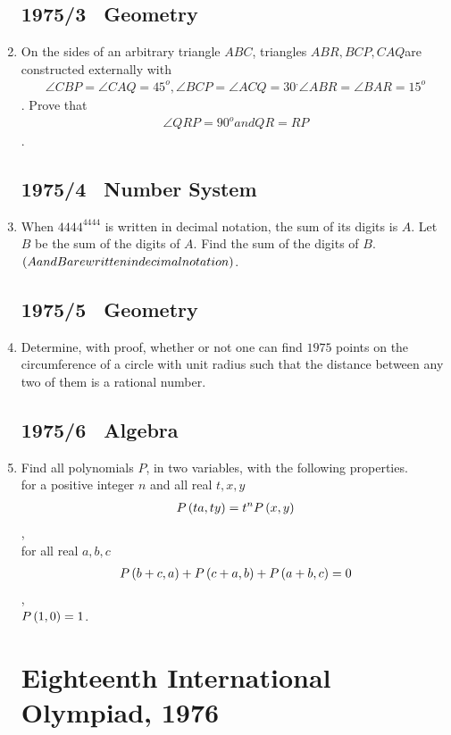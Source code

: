 \documentclass{article}
\begin{document}
\begin{enumerate}
			\subsection*{1975/3 \ Geometry}
		\item On the sides of an arbitrary triangle $ABC$, triangles $ABR, BCP, CAQ $are constructed externally with \begin{align}\angle CBP = \angle CAQ = 45^o, \angle BCP = \angle ACQ = 30^, \angle ABR = \angle BAR = 15^o\end{align}. Prove that \begin{align}\angle QRP = 90^o and QR = RP\end{align}.
\subsection*{1975/4 \ Number System}
			\item When $4444^{4444}$ is written in decimal notation, the sum of its digits is $A$. Let $B$ be the sum of the digits of $A$. Find the sum of the digits of $B$. $\left(A and B are written in decimal notation\right)$.
\subsection*{1975/5 \ Geometry}

			\item Determine, with proof, whether or not one can find $1975$ points on the circumference of a circle with unit radius such that the distance between any two of them is a rational number.
\subsection*{1975/6 \ Algebra}
			\item Find all polynomials $P$, in two variables, with the following properties.\\  for a positive integer $n$ and all real $t, x, y$
				\begin{align} P\left(ta,ty\right)=t^n P\left(x,y\right) \end{align}
					,\\  for all real $a, b, c$ \begin{align}P\left(b + c, a\right) +P\left(c + a, b\right) +P\left(a + b, c\right) =0\end{align},\\  $P\left(1, 0\right) = 1$.

\newpage
		\section*{Eighteenth International Olympiad, 1976}

\end{enumerate}
\end{document}
